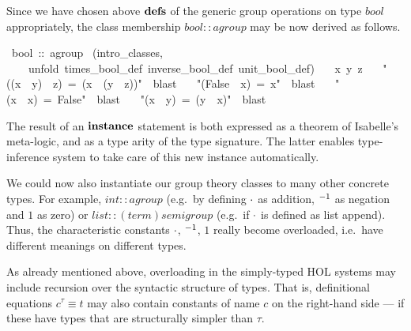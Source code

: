 \begin{isabelle}
\begin{isamarkuptext}
 \medskip Since we have chosen above ${\mathord{\mathbf{defs}}}$ of the generic group
 operations on type $bool$ appropriately, the class membership $bool
 :: agroup$ may be now derived as follows.%
\end{isamarkuptext}%
~bool~::~agroup\isanewline
{}~(intro\_classes,\isanewline
~~~~unfold~times\_bool\_def~inverse\_bool\_def~unit\_bool\_def)\isanewline
~~~x~y~z\isanewline
~~~{"}((x~{\isasymnoteq}~y)~{\isasymnoteq}~z)~=~(x~{\isasymnoteq}~(y~{\isasymnoteq}~z)){"}~~blast\isanewline
~~~{"}(False~{\isasymnoteq}~x)~=~x{"}~~blast\isanewline
~~~{"}(x~{\isasymnoteq}~x)~=~False{"}~~blast\isanewline
~~~{"}(x~{\isasymnoteq}~y)~=~(y~{\isasymnoteq}~x){"}~~blast\isanewline
{}%
\begin{isamarkuptext}%
The result of an $\emph{\bf instance}$ statement is both expressed
 as a theorem of Isabelle's meta-logic, and as a type arity of the
 type signature.  The latter enables type-inference system to take
 care of this new instance automatically.

 \medskip We could now also instantiate our group theory classes to
 many other concrete types.  For example, $int :: agroup$ (e.g.\ by
 defining $\cdot$ as addition, $\emph{${}^{-1}$}$ as negation and $1$ as
 zero) or $list :: (term)semigroup$ (e.g.\ if $\cdot$ is defined as
 list append).  Thus, the characteristic constants $\cdot$,
 $\emph{${}^{-1}$}$, $1$ really become overloaded, i.e.\ have different
 meanings on different types.%
\end{isamarkuptext}%
%
%
\begin{isamarkuptext}%
As already mentioned above, overloading in the simply-typed HOL
 systems may include recursion over the syntactic structure of types.
 That is, definitional equations $c^\tau \equiv t$ may also contain
 constants of name $c$ on the right-hand side --- if these have types
 that are structurally simpler than $\tau$.


\end{isamarkuptext}
\end{isabelle}
